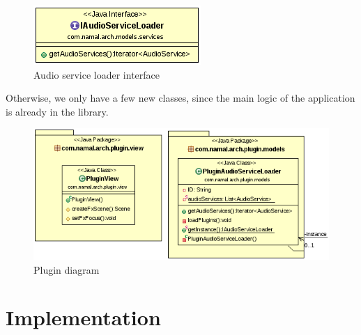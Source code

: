 \documentclass{report}
\begin{document}
{\begin{center}
\begin{figure}[H]
  \includegraphics[scale=0.4]{class/AudioServiceLoader.png}
  \caption{Audio service loader interface}
  \label{AudioServiceLoader}
\end{figure}
\end{center}

Otherwise, we only have a few new classes, since the main logic of the application is already in the library. 

\begin{center}
\begin{figure}[H]

  \includegraphics[scale=0.4]{class/Plugin.png}
  \caption{Plugin diagram}
  \label{Plugin}
\end{figure}
\end{center}
}


\chapter{Implementation}
\end{document}

